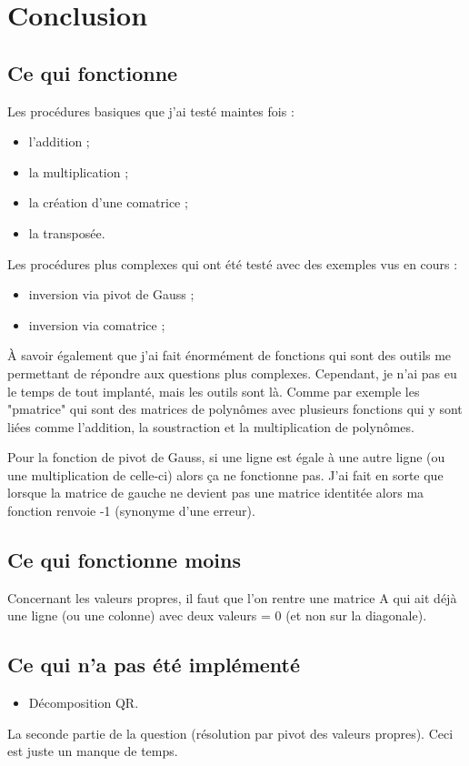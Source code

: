 \chapter{Conclusion}

\section{Ce qui fonctionne}

Les procédures basiques que j'ai testé maintes fois : 
\begin{itemize}
	\item l'addition ;
	\item la multiplication ;
	\item la création d'une comatrice ;
	\item la transposée.
\end{itemize}

Les procédures plus complexes qui ont été testé avec des exemples vus en cours :
\begin{itemize}
	\item inversion via pivot de Gauss ;
	\item inversion via comatrice ;
\end{itemize}

À savoir également que j'ai fait énormément de fonctions qui sont des outils me permettant de répondre aux questions plus complexes.
Cependant, je n'ai pas eu le temps de tout implanté, mais les outils sont là. 
Comme par exemple les "pmatrice" qui sont des matrices de polynômes avec plusieurs fonctions qui y sont liées comme l'addition, la soustraction et la multiplication de polynômes.

Pour la fonction de pivot de Gauss, si une ligne est égale à une autre ligne (ou une multiplication de celle-ci) alors ça ne fonctionne pas.
J'ai fait en sorte que lorsque la matrice de gauche ne devient pas une matrice identitée alors ma fonction renvoie -1 (synonyme d'une erreur).

\section{Ce qui fonctionne moins}

Concernant les valeurs propres, il faut que l'on rentre une matrice A qui ait déjà une ligne (ou une colonne) avec deux valeurs = 0 (et non sur la diagonale).

\section{Ce qui n'a pas été implémenté}
\begin{itemize}
	\item Décomposition QR.
\end{itemize}
La seconde partie de la question (résolution par pivot des valeurs propres).
Ceci est juste un manque de temps.
